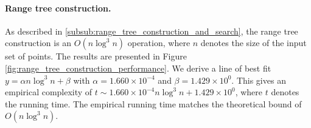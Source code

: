 \documentclass{article}
\newcommand{\figref}[1]{Figure \ref{#1}}
\begin{document}
\paragraph{Range tree construction.} As described in \ref{subsub:range_tree_construction_and_search}, the range tree construction is an $O(n\log^3 n)$ operation, where $n$ denotes the size of the input set of points. The results are presented in \figref{fig:range_tree_construction_performance}. We derive a line of best fit $y = \alpha n \log^3 n + \beta$ with $\alpha = 1.660 \times 10^{-4}$ and $\beta = 1.429 \times 10^{0}$. This gives an empirical complexity of $t \sim 1.660 \times 10^{-4} n\log^3 n + 1.429 \times 10^{0}$, where $t$ denotes the running time. The empirical running time matches the theoretical bound of $O(n \log^3 n)$.

\begin{figure}[h]
    \begin{floatrow}
    \end{floatrow}
\end{figure}
\end{document}
